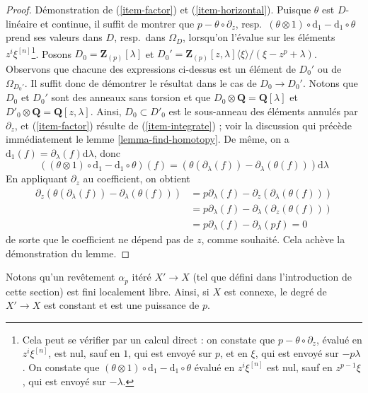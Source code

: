 \begin{proof}
\medskip\noindent
Démonstration de (\ref{item-factor}) et (\ref{item-horizontal}).
Puisque $\theta$ est $D$-linéaire et continue, il suffit de montrer que
$p - \theta \circ \partial_z$,
resp.\ $(\theta \otimes 1) \circ \text{d}_1 - \text{d}_1 \circ \theta$
prend ses valeurs dans $D$, resp.\ dans $\Omega_D$, lorsqu'on l'évalue sur les
éléments $z^i\xi^{[n]}$\footnote{Cela peut se vérifier par un calcul direct :
on constate que $p - \theta \circ \partial_z$, évalué en
$z^i\xi^{[n]}$, est nul, sauf en $1$, qui est envoyé sur $p$, et en
$\xi$, qui est envoyé sur $-p\lambda$. On constate que
$(\theta \otimes 1) \circ \text{d}_1 - \text{d}_1 \circ \theta$
évalué en $z^i\xi^{[n]}$ est nul, sauf en $z^{p - 1}\xi$,
qui est envoyé sur $-\lambda$.}.
Posons $D_0 = \mathbf{Z}_{(p)}[\lambda]$ et
$D_0' = \mathbf{Z}_{(p)}[z, \lambda]\langle \xi \rangle/(\xi - z^p + \lambda)$.
Observons que chacune des expressions ci-dessus est un élément de
$D_0'$ ou de $\Omega_{D_0'}$. Il suffit donc de démontrer le résultat
dans le cas de $D_0 \to D_0'$. Notons que $D_0$ et $D_0'$
sont des anneaux sans torsion et que $D_0 \otimes \mathbf{Q} = \mathbf{Q}[\lambda]$
et $D'_0 \otimes \mathbf{Q} = \mathbf{Q}[z, \lambda]$.
Ainsi, $D_0 \subset D'_0$ est le sous-anneau des éléments annulés
par $\partial_z$, et (\ref{item-factor})
résulte de (\ref{item-integrate}) ; voir la discussion qui précède immédiatement le
lemme \ref{lemma-find-homotopy}. De même, on a
$\text{d}_1(f) = \partial_\lambda(f)\text{d}\lambda$, donc
$$
\left((\theta \otimes 1) \circ \text{d}_1 - \text{d}_1 \circ \theta\right)(f)
=
\left(\theta(\partial_\lambda(f)) - \partial_\lambda(\theta(f))\right)
\text{d}\lambda
$$
En appliquant $\partial_z$ au coefficient, on obtient
\begin{align*}
\partial_z\left(
\theta(\partial_\lambda(f)) - \partial_\lambda(\theta(f))
\right)
& =
p \partial_\lambda(f) - \partial_z(\partial_\lambda(\theta(f))) \\
& =
p \partial_\lambda(f) - \partial_\lambda(\partial_z(\theta(f))) \\
& =
p \partial_\lambda(f) - \partial_\lambda(p f) = 0
\end{align*}
de sorte que le coefficient ne dépend pas de $z$, comme souhaité.
Cela achève la démonstration du lemme.
\end{proof}

\noindent
Notons qu'un revêtement $\alpha_p$ itéré $X' \to X$ (tel que défini dans
l'introduction de cette section) est fini localement libre. Ainsi, si $X$ est
connexe, le degré de $X' \to X$ est constant et est une puissance de $p$.

